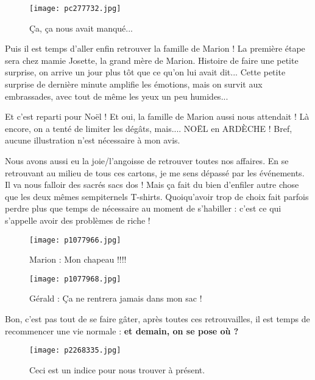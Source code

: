 \documentclass{book}
\begin{document}
\begin{figure}[H]
\centering
\texttt{[image: pc277732.jpg]}
\caption*{Ça, ça nous avait manqué...}
\end{figure}

Puis il est temps d'aller enfin retrouver la famille de Marion ! La première étape sera chez mamie Josette, la grand mère de Marion. Histoire de faire une petite surprise, on arrive un jour plus tôt que ce qu'on lui avait dit... Cette petite surprise de dernière minute amplifie les émotions, mais on survit aux embrassades, avec tout de même les yeux un peu humides...

Et c'est reparti pour Noël ! Et oui, la famille de Marion aussi nous attendait ! Là encore, on a tenté de limiter les dégâts, mais.... NOËL en ARDÈCHE ! Bref, aucune illustration n'est nécessaire à mon avis.

Nous avons aussi eu la joie/l'angoisse de retrouver toutes nos affaires. En se retrouvant au milieu de tous ces cartons, je me sens dépassé par les événements. Il va nous falloir des sacrés sacs dos ! Mais ça fait du bien d'enfiler autre chose que les deux mêmes sempiternels T-shirts. Quoiqu'avoir trop de choix fait parfois perdre plus que temps de nécessaire au moment de s'habiller : c'est ce qui s'appelle avoir des problèmes de riche !


\begin{figure}[H]
\centering
\texttt{[image: p1077966.jpg]}
\caption*{Marion : Mon chapeau !!!!}
\end{figure}


\begin{figure}[H]
\centering
\texttt{[image: p1077968.jpg]}
\caption*{Gérald : Ça ne rentrera jamais dans mon sac !}
\end{figure}

Bon, c'est pas tout de se faire gâter, après toutes ces retrouvailles, il est temps de recommencer une vie normale : \textbf{et demain, on se pose où ?}


\begin{figure}[H]
\centering
\texttt{[image: p2268335.jpg]}
\caption*{Ceci est un indice pour nous trouver à présent.}
\end{figure}

\tableofcontents
\end{document}
